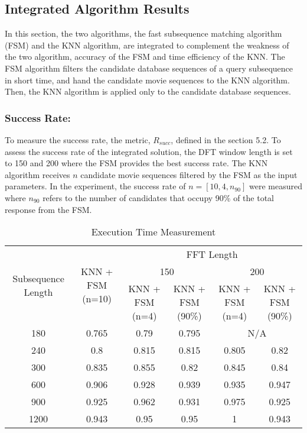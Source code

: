 \subsection{Integrated Algorithm Results}

In this section, the two algorithms, the fast subsequence matching algorithm (FSM) and the KNN algorithm, are integrated to complement the weakness of the two algorithm, accuracy of the FSM and time efficiency of the KNN. The FSM algorithm filters the candidate database sequences of a query subsequence in short time, and hand the candidate movie sequences to the KNN algorithm. Then, the KNN algorithm is applied only to the candidate database sequences.

\subsubsection{Success Rate:} To measure the success rate, the metric, $R_{succ}$, defined in the section 5.2. To assess the success rate of the integrated solution, the DFT window length is set to 150 and 200 where the FSM provides the best success rate. The KNN algorithm receives $n$ candidate movie sequences filtered by the FSM as the input parameters. In the experiment, the success rate of $n = [10, 4, n_{90}]$ were measured where $n_{90}$ refers to the number of candidates that occupy 90\% of the total response from the FSM.

\begin{table}[h!]
\begin{center}
\begin{tabular}{|c| c| c| c| c| c| }
\hline
\multirow{3}{*}{Subsequence Length} & \multirow{3}{*}{KNN + FSM (n=10)} & \multicolumn{4}{c|}{FFT Length} \\
\cline{3-6}
   & & \multicolumn{2}{c|}{150}  & \multicolumn{2}{c|}{200}\\
\cline{3-6}
  & &KNN + FSM (n=4) & KNN + FSM (90\%) &KNN + FSM (n=4)& KNN + FSM (90\%)\\
\hline
180 & 0.765 & 0.79 & 0.795 &  \multicolumn{2}{c|}{N/A}\\
\cline{5-6}
240 & 0.8 & 0.815 & 0.815 & 0.805 &0.82
\tabularnewline
300 & 0.835 & 0.855 & 0.82 & 0.845 & 0.84
\tabularnewline
600 & 0.906 &0.928 & 0.939& 0.935& 0.947
\tabularnewline
900 & 0.925 & 0.962 & 0.931 & 0.975&0.925
\tabularnewline
1200 & 0.943 & 0.95 & 0.95 & 1&0.943
\tabularnewline
\hline
\end{tabular}
\end{center}
\caption{Execution Time Measurement}
\label{tab:exec_int_table}
\end{table}

